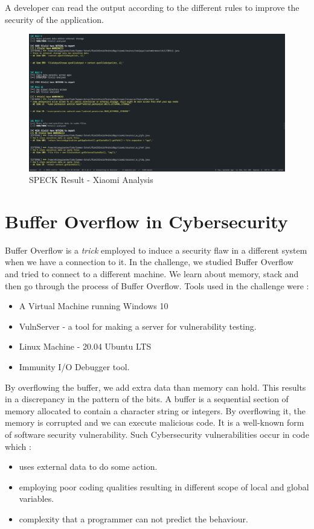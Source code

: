 \documentclass[runningheads]{llncs}
\begin{document}
A developer can read the output according to the different rules to improve the security of the application. 

\begin{figure}
    \includegraphics[width=\textwidth]{images/SPECK.png}
    \caption{SPECK Result - Xiaomi Analysis} \label{fig4}
\end{figure}

\section{Buffer Overflow in Cybersecurity}
Buffer Overflow is a \textit{trick} employed to induce a security flaw in a different system when we have a connection to it.
In the challenge, we studied Buffer Overflow and tried to connect to a different machine. We learn about memory, stack and then go through the process of 
Buffer Overflow. Tools used in the challenge were : 
\begin{itemize}
    \item A Virtual Machine running Windows 10
    \item VulnServer - a tool for making a server for vulnerability testing.
    \item Linux Machine - 20.04 Ubuntu LTS
    \item Immunity I/O Debugger tool.
\end{itemize}

By overflowing the buffer, we add extra data than memory can hold. This results in a discrepancy in the pattern of the bits. A buffer is a sequential section of memory allocated to contain a character string or integers. By overflowing it, the memory is corrupted and we can execute malicious code. It is a well-known form of software security vulnerability.
Such Cybersecurity vulnerabilities occur in code which : 
\begin{itemize}
    \item uses external data to do some action.
    \item employing poor coding qualities resulting in different scope of local and global variables.
    \item complexity that a programmer can not predict the behaviour.
\end{itemize}
\end{document}
